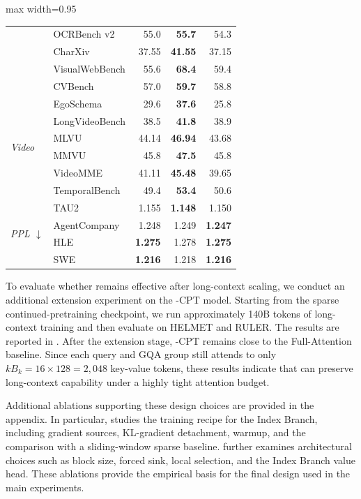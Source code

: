 \begin{table}[H]
{\begin{adjustbox}{max width=0.95\linewidth}
\begin{tabular}{llrrr}
 & OCRBench v2 & 55.0 & \textbf{55.7} & 54.3 \\
 & CharXiv & 37.55 & \textbf{41.55} & 37.15 \\
 & VisualWebBench & 55.6 & \textbf{68.4} & 59.4 \\
 & CVBench & 57.0 & \textbf{59.7} & 58.8 \\
\midrule
\multirow{6}{*}{\textit{Video}} & EgoSchema & 29.6 & \textbf{37.6} & 25.8 \\
 & LongVideoBench & 38.5 & \textbf{41.8} & 38.9 \\
 & MLVU & 44.14 & \textbf{46.94} & 43.68 \\
 & MMVU & 45.8 & \textbf{47.5} & 45.8 \\
 & VideoMME & 41.11 & \textbf{45.48} & 39.65 \\
 & TemporalBench & 49.4 & \textbf{53.4} & 50.6 \\
\midrule
\multirow{4}{*}{\textit{PPL $\downarrow$}} & TAU2 & 1.155 & \textbf{1.148} & 1.150 \\
 & AgentCompany & 1.248 & 1.249 & \textbf{1.247} \\
 & HLE & \textbf{1.275} & 1.278 & \textbf{1.275} \\
 & SWE & \textbf{1.216} & 1.218 & \textbf{1.216} \\
\bottomrule
\end{tabular}
\end{adjustbox}
}
\end{table}


To evaluate whether \method{} remains effective after long-context scaling, we conduct an additional extension experiment on the \method{}-CPT model. Starting from the sparse continued-pretraining checkpoint, we run approximately 140B tokens of long-context training and then evaluate on HELMET and RULER. The results are reported in . After the extension stage, \method{}-CPT remains close to the Full-Attention baseline. Since each query and GQA group still attends to only \(k B_k=16\times128=2{,}048\) key-value tokens, these results indicate that \method{} can preserve long-context capability under a highly tight attention budget.

Additional ablations supporting these design choices are provided in the appendix. In particular,  studies the training recipe for the Index Branch, including gradient sources, KL-gradient detachment, warmup, and the comparison with a sliding-window sparse baseline.  further examines architectural choices such as block size, forced sink, local selection, and the Index Branch value head. These ablations provide the empirical basis for the final \method{} design used in the main experiments.


